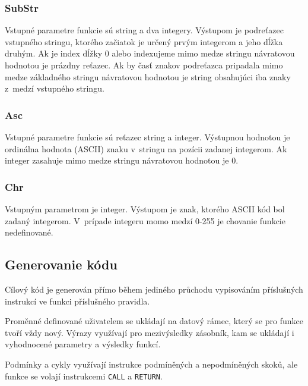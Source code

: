 \documentclass{article}
\begin{document}
            \subsubsection{SubStr}
            Vstupné parametre funkcie sú string  a dva integery. Výstupom je podreťazec vstupného
            stringu, ktorého začiatok je určený prvým integerom a jeho dĺžka druhým. Ak je index dĺžky
            0 alebo indexujeme mimo medze stringu návratovou hodnotou je prázdny reťazec. Ak by časť 
            znakov podreťazca pripadala mimo medze základného stringu návratovou hodnotou je string
            obsahujúci iba znaky z~medzí vstupného stringu.
            
            \subsubsection{Asc}
            Vstupné parametre funkcie sú reťazec string a integer. Výstupnou hodnotou je ordinálna
            hodnota (ASCII) znaku v~stringu na pozícii zadanej integerom. Ak integer zasahuje mimo 
            medze stringu návratovou hodnotou je 0.
            
            \subsubsection{Chr}
            Vstupným parametrom je integer. Výstupom je znak, ktorého ASCII kód bol zadaný integerom.
            V~prípade integeru momo medzí 0-255 je chovanie funkcie nedefinované.
            
        \subsection{Generovanie kódu}
            Cílový kód je generován přímo během jediného průchodu vypisováním příslušných instrukcí ve funkci
            příslušného pravidla.
            
            Proměnné definované uživatelem se ukládají na datový rámec, který se pro funkce
            tvoří vždy nový.
            Výrazy využívají pro mezivýsledky zásobník, kam se ukládají i vyhodnocené parametry a výsledky funkcí.
            
            Podmínky a cykly využívají instrukce podmíněných a nepodmíněných skoků, ale funkce se volají instrukcemi \texttt{CALL}
            a \texttt{RETURN}.
        
\end{document}
